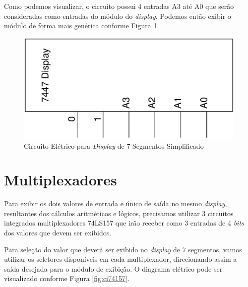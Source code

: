 \documentclass{article}
\begin{document}
Como podemos visualizar, o circuito possui 4 entradas A3 até A0 que serão
consideradas como entradas do módulo do \emph{display}. Podemos então exibir o
módulo de forma mais genérica conforme Figura \ref{fig:s-ci7447}.

\begin{figure}
    \centering{}
    \includegraphics[scale=0.3,angle=270]{s-ci7447.ps}
    \caption{Circuito Elétrico para \emph{Display} de 7 Segmentos Simplificado}
    \label{fig:s-ci7447}
\end{figure}

\section{Multiplexadores}

Para exibir os dois valores de entrada e único de saída no mesmo \emph{display},
resultantes dos cálculos aritméticos e lógicos, precisamos utilizar 3 circuitos
integrados multiplexadores 74LS157 que irão receber como 3 entradas de 4
\emph{bits} dos valores que devem ser exibidos.

Para seleção do valor que deverá ser exibido no \emph{display} de 7 segmentos,
vamos utilizar os seletores disponíveis em cada multiplexador, direcionando
assim a saída desejada para o módulo de exibição. O diagrama elétrico pode ser
visualizado conforme Figura \ref{fig:ci74157}.
\end{document}
